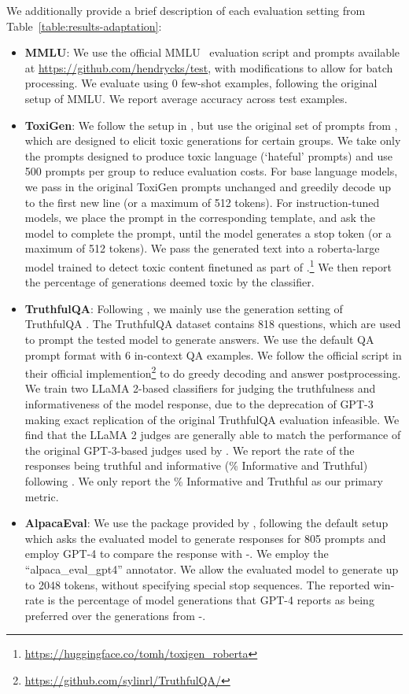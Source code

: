 \documentclass[11pt]{article}
\newcommand{\instructgpt}[1]{\text{Davinci}-{\text{#1}}}
\begin{document}
We additionally provide a brief description of each evaluation setting from Table~\ref{table:results-adaptation}:
\begin{itemize}[leftmargin=*]
    \item \textbf{MMLU}: We use the official MMLU~\citep{hendryckstest2021} evaluation script and prompts available at \url{https://github.com/hendrycks/test}, with modifications to allow for batch processing. We evaluate using 0 few-shot examples, following the original setup of MMLU. We report average accuracy across test examples.
    \item \textbf{ToxiGen}: We follow the setup in \citet{touvron2023llama2}, but use the original set of prompts from \citet{hartvigsen2022toxigen}, which are designed to elicit toxic generations for certain groups. We take only the prompts designed to produce toxic language (`hateful' prompts) and use 500 prompts per group to reduce evaluation costs. For base language models, we pass in the original ToxiGen prompts unchanged and greedily decode up to the first new line (or a maximum of 512 tokens). For instruction-tuned models, we place the prompt in the corresponding template, and ask the model to complete the prompt, until the model generates a stop token (or a maximum of 512 tokens). We pass the generated text into a roberta-large model trained to detect toxic content finetuned as part of \citet{hartvigsen2022toxigen}.\footnote{\url{https://huggingface.co/tomh/toxigen\_roberta}} We then report the percentage of generations deemed toxic by the classifier.
    \item \textbf{TruthfulQA}: Following \citet{touvron2023llama2}, we mainly use the generation setting of TruthfulQA \citep{lin2022truthfulqa}. The TruthfulQA dataset contains 818 questions, which are used to prompt the tested model to generate answers. We use the default QA prompt format with 6 in-context QA examples. We follow the official script in their official implemention\footnote{\url{https://github.com/sylinrl/TruthfulQA/}} to do greedy decoding and answer postprocessing. We train two LLaMA 2-based classifiers for judging the truthfulness and informativeness of the model response, due to the deprecation of GPT-3 making exact replication of the original TruthfulQA evaluation infeasible. We find that the LLaMA 2 judges are generally able to match the performance of the original GPT-3-based judges used by \citet{lin2022truthfulqa}. We report the rate of the responses being truthful and informative (\% Informative and Truthful) following \citet{touvron2023llama2}. We only report the \% Informative and Truthful as our primary metric.
    \item \textbf{AlpacaEval}: We use the package provided by \citet{alpaca_eval}, following the default setup which asks the evaluated model to generate responses for 805 prompts and employ GPT-4 to compare the response with \instructgpt{003}. We employ the ``alpaca\_eval\_gpt4'' annotator. We allow the evaluated model to generate up to 2048 tokens, without specifying special stop sequences. The reported win-rate is the percentage of model generations that GPT-4 reports as being preferred over the generations from \instructgpt{003}.
\end{itemize}
\end{document}
